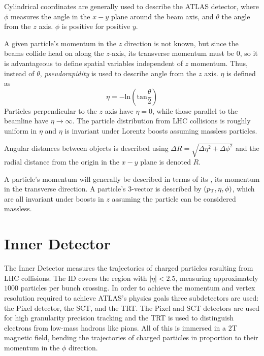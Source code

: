 Cylindrical coordinates are generally used to describe the \ac{ATLAS} detector, where $\phi$ measures the angle in the $x-y$ plane around the beam axis, and $\theta$ the angle from the $z$ axis. $\phi$ is positive for positive $y$. 

A given particle's momentum in the $z$ direction is not known, but since the beams collide head on along the $z$-axis, its transverse momentum must be $0$, so it is advantageous to define spatial variables independent of $z$ momentum. Thus, instead of $\theta$, \emph{pseudorapidity} is used to describe angle from the $z$ axis. $\eta$ is defined as
\begin{equation}
\eta = - \textrm{ln}(\textrm{tan}\frac{\theta}{2}) 
\end{equation}
Particles perpendicular to the $z$ axis have $\eta = 0$, while those parallel to the beamline have $\eta \rightarrow \infty$. The particle distribution from \ac{LHC} collisions is roughly uniform in $\eta$ and $\eta$ is invariant under Lorentz boosts assuming massless particles.

Angular distances between objects is described using $\Delta R = \sqrt{\Delta \eta ^2 + \Delta \phi ^2}$ and the radial distance from the origin in the $x-y$ plane is denoted $R$. 

A particle's momentum will generally be described in terms of its \pT, its momentum in the transverse direction. A particle's $3$-vector is described by $(p_{\text{T}}, \eta, \phi)$, which are all invariant under boosts in $z$ assuming the particle can be considered massless.





\section{Inner Detector}
The Inner Detector measures the trajectories of charged particles resulting from \ac{LHC} collisions. The \ac{ID} covers the region with $|\eta| < 2.5$, measuring approximately $1000$ particles per bunch crossing. In order to achieve the momentum and vertex resolution required to achieve \ac{ATLAS}'s physics goals three subdetectors are used: the Pixel detector, the \ac{SCT}, and the \ac{TRT}. The Pixel and \ac{SCT} detectors are used for high granularity precision tracking and the \ac{TRT} is used to distinguish electrons from low-mass hadrons like pions. All of this is immersed in a $2$T magnetic field, bending the trajectories of charged particles in proportion to their momentum in the $\phi$ direction.

